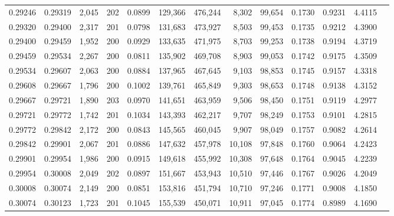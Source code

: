 \begin{tabular}{rrrrrrrrrrrrr}
0.29246 & 0.29319 & 2,045 & 202 &                                     0.0899 & 129,366 & 476,244 &   8,302 &  99,654 & 0.1730 & 0.9231 & 4.4115 \\
0.29320 & 0.29400 & 2,317 & 201 &                                     0.0798 & 131,683 & 473,927 &   8,503 &  99,453 & 0.1735 & 0.9212 & 4.3900 \\
0.29400 & 0.29459 & 1,952 & 200 &                                     0.0929 & 133,635 & 471,975 &   8,703 &  99,253 & 0.1738 & 0.9194 & 4.3719 \\
0.29459 & 0.29534 & 2,267 & 200 &                                     0.0811 & 135,902 & 469,708 &   8,903 &  99,053 & 0.1742 & 0.9175 & 4.3509 \\
0.29534 & 0.29607 & 2,063 & 200 &                                     0.0884 & 137,965 & 467,645 &   9,103 &  98,853 & 0.1745 & 0.9157 & 4.3318 \\
0.29608 & 0.29667 & 1,796 & 200 &                                     0.1002 & 139,761 & 465,849 &   9,303 &  98,653 & 0.1748 & 0.9138 & 4.3152 \\
0.29667 & 0.29721 & 1,890 & 203 &                                     0.0970 & 141,651 & 463,959 &   9,506 &  98,450 & 0.1751 & 0.9119 & 4.2977 \\
0.29721 & 0.29772 & 1,742 & 201 &                                     0.1034 & 143,393 & 462,217 &   9,707 &  98,249 & 0.1753 & 0.9101 & 4.2815 \\
0.29772 & 0.29842 & 2,172 & 200 &                                     0.0843 & 145,565 & 460,045 &   9,907 &  98,049 & 0.1757 & 0.9082 & 4.2614 \\
0.29842 & 0.29901 & 2,067 & 201 &                                     0.0886 & 147,632 & 457,978 &  10,108 &  97,848 & 0.1760 & 0.9064 & 4.2423 \\
0.29901 & 0.29954 & 1,986 & 200 &                                     0.0915 & 149,618 & 455,992 &  10,308 &  97,648 & 0.1764 & 0.9045 & 4.2239 \\
0.29954 & 0.30008 & 2,049 & 202 &                                     0.0897 & 151,667 & 453,943 &  10,510 &  97,446 & 0.1767 & 0.9026 & 4.2049 \\
0.30008 & 0.30074 & 2,149 & 200 &                                     0.0851 & 153,816 & 451,794 &  10,710 &  97,246 & 0.1771 & 0.9008 & 4.1850 \\
0.30074 & 0.30123 & 1,723 & 201 &                                     0.1045 & 155,539 & 450,071 &  10,911 &  97,045 & 0.1774 & 0.8989 & 4.1690 \\

\end{tabular}
